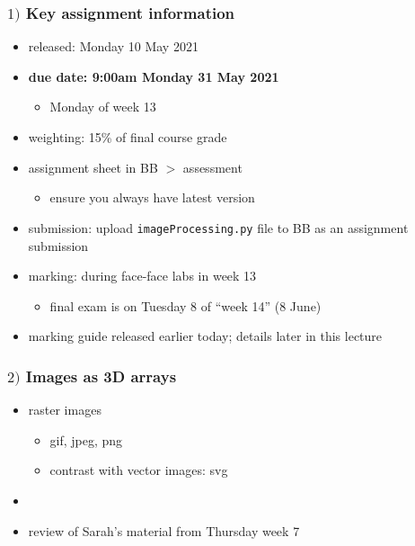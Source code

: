 \documentclass[english,14pt]{beamer}
\begin{document}
\begin{frame}[fragile]

\frametitle{$1)$ Key assignment information}

\begin{itemize}
	\item released: Monday 10 May 2021
	\item \textbf{due date: 9:00am Monday 31 May 2021}
	\begin{itemize}
		\item Monday of week 13
	\end{itemize}
	\item weighting: 15\% of final course grade
	\item assignment sheet in BB $>$ assessment
	\begin{itemize}
		\item ensure you always have latest version
	\end{itemize}
	\item submission: upload \texttt{imageProcessing.py} file to BB as an assignment submission
	\item marking: during face-face labs in week 13
	\begin{itemize}
		\item final exam is on Tuesday 8 of ``week 14'' (8 June)
	\end{itemize}
	\item marking guide released earlier today; details later in this lecture	
\end{itemize}

\end{frame}


\begin{frame}[fragile]

\frametitle{$2)$ Images as 3D arrays}

\begin{itemize}


	\item raster images
	\begin{itemize}
		\item gif, jpeg, png
		\item contrast with vector images: svg
	\end{itemize}

	\item[]
	
	\item review of Sarah's material from Thursday week 7
\end{itemize}

\end{frame}
\end{document}
